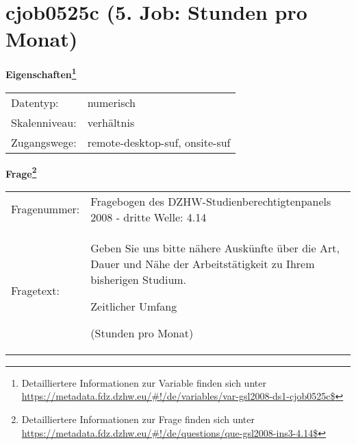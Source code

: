 
    \setcounter{footnote}{0}

    \vspace*{-1.8cm}
	\section{cjob0525c (5. Job: Stunden pro Monat)}
	\label{section:cjob0525c}



    \vspace*{0.5cm}
    \noindent\textbf{Eigenschaften\footnote{Detailliertere Informationen zur Variable finden sich unter
		\url{https://metadata.fdz.dzhw.eu/\#!/de/variables/var-gsl2008-ds1-cjob0525c$}}}\\
	\begin{tabularx}{\hsize}{@{}lX}
	Datentyp: & numerisch \\
	Skalenniveau: & verhältnis \\
	Zugangswege: &
	  remote-desktop-suf, 
	  onsite-suf
 \\
    \end{tabularx}



				\vspace*{0.5cm}
                \noindent\textbf{Frage\footnote{Detailliertere Informationen zur Frage finden sich unter
		              \url{https://metadata.fdz.dzhw.eu/\#!/de/questions/que-gsl2008-ins3-4.14$}}}\\
				\begin{tabularx}{\hsize}{@{}lX}
					Fragenummer: &
					  Fragebogen des DZHW-Studienberechtigtenpanels 2008 - dritte Welle:
					  4.14
 \\
					Fragetext: & Geben Sie uns bitte nähere Auskünfte über die Art, Dauer und Nähe der Arbeitstätigkeit zu Ihrem bisherigen Studium.\par  Zeitlicher Umfang\par  (Stunden pro Monat) \\
				\end{tabularx}





